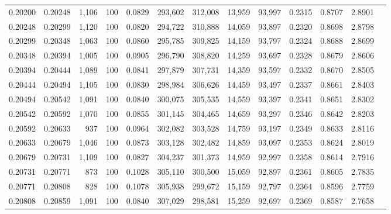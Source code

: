 \begin{tabular}{rrrrrrrrrrrrr}
0.20200 & 0.20248 & 1,106 & 100 &                                     0.0829 & 293,602 & 312,008 &  13,959 &  93,997 & 0.2315 & 0.8707 & 2.8901 \\
0.20248 & 0.20299 & 1,120 & 100 &                                     0.0820 & 294,722 & 310,888 &  14,059 &  93,897 & 0.2320 & 0.8698 & 2.8798 \\
0.20299 & 0.20348 & 1,063 & 100 &                                     0.0860 & 295,785 & 309,825 &  14,159 &  93,797 & 0.2324 & 0.8688 & 2.8699 \\
0.20348 & 0.20394 & 1,005 & 100 &                                     0.0905 & 296,790 & 308,820 &  14,259 &  93,697 & 0.2328 & 0.8679 & 2.8606 \\
0.20394 & 0.20444 & 1,089 & 100 &                                     0.0841 & 297,879 & 307,731 &  14,359 &  93,597 & 0.2332 & 0.8670 & 2.8505 \\
0.20444 & 0.20494 & 1,105 & 100 &                                     0.0830 & 298,984 & 306,626 &  14,459 &  93,497 & 0.2337 & 0.8661 & 2.8403 \\
0.20494 & 0.20542 & 1,091 & 100 &                                     0.0840 & 300,075 & 305,535 &  14,559 &  93,397 & 0.2341 & 0.8651 & 2.8302 \\
0.20542 & 0.20592 & 1,070 & 100 &                                     0.0855 & 301,145 & 304,465 &  14,659 &  93,297 & 0.2346 & 0.8642 & 2.8203 \\
0.20592 & 0.20633 &   937 & 100 &                                     0.0964 & 302,082 & 303,528 &  14,759 &  93,197 & 0.2349 & 0.8633 & 2.8116 \\
0.20633 & 0.20679 & 1,046 & 100 &                                     0.0873 & 303,128 & 302,482 &  14,859 &  93,097 & 0.2353 & 0.8624 & 2.8019 \\
0.20679 & 0.20731 & 1,109 & 100 &                                     0.0827 & 304,237 & 301,373 &  14,959 &  92,997 & 0.2358 & 0.8614 & 2.7916 \\
0.20731 & 0.20771 &   873 & 100 &                                     0.1028 & 305,110 & 300,500 &  15,059 &  92,897 & 0.2361 & 0.8605 & 2.7835 \\
0.20771 & 0.20808 &   828 & 100 &                                     0.1078 & 305,938 & 299,672 &  15,159 &  92,797 & 0.2364 & 0.8596 & 2.7759 \\
0.20808 & 0.20859 & 1,091 & 100 &                                     0.0840 & 307,029 & 298,581 &  15,259 &  92,697 & 0.2369 & 0.8587 & 2.7658 \\

\end{tabular}
